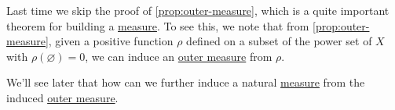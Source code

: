 \begin{prev}
	Last time we skip the proof of \autoref{prop:outer-measure}, which is a quite important theorem for building a \hyperref[def:measure]{measure}.
	To see this, we note that from \autoref{prop:outer-measure}, given a positive function \(\rho \) defined on a subset of the power set of \(X\)
	with \(\rho (\varnothing ) = 0\), we can induce an \hyperref[def:outer-measure]{outer measure} from \(\rho \).
\end{prev}

\begin{note}
	We'll see later that how can we further induce a natural \hyperref[def:measure]{measure} from the induced \hyperref[def:outer-measure]{outer measure}.
\end{note}

